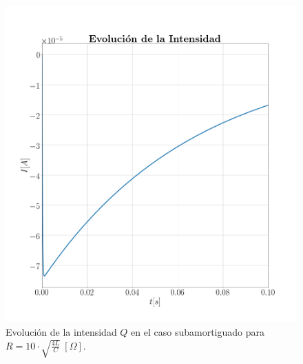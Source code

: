 \documentclass[journal]{IEEEtran}
\begin{document}
\begin{figure}[!htb]
    \centering
    \includegraphics[width=\linewidth,trim={40 70 70 70},clip]{intensidadsobreamortiguado.png}
    \caption{Evolución de la intensidad $Q$ en el caso subamortiguado para $R=10 \cdot\sqrt{\frac{4L}{C}}~[\Omega]$.}
    \label{fig:intensidadsobreamortiguado}
\end{figure}
\end{document}
